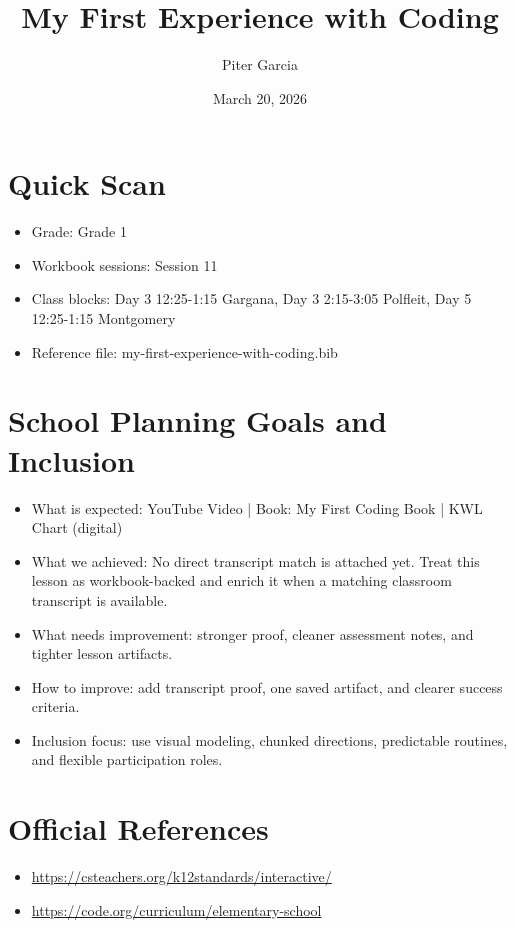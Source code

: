 \documentclass[11pt]{article}
\title{My First Experience with Coding}
\author{Piter Garcia}
\date{March 20, 2026}
\begin{document}
    \maketitle
    \section*{Quick Scan}
    \begin{itemize}[leftmargin=*]
    \item Grade: Grade 1
    \item Workbook sessions: Session 11
    \item Class blocks: Day 3 12:25-1:15 Gargana, Day 3 2:15-3:05 Polfleit, Day 5 12:25-1:15 Montgomery
    \item Reference file: my-first-experience-with-coding.bib
    \end{itemize}
    \section*{School Planning Goals and Inclusion}
    \begin{itemize}[leftmargin=*]
    \item What is expected: YouTube Video | Book: My First Coding Book | KWL Chart (digital)
    \item What we achieved: No direct transcript match is attached yet. Treat this lesson as workbook-backed and enrich it when a matching classroom transcript is available.
    \item What needs improvement: stronger proof, cleaner assessment notes, and tighter lesson artifacts.
    \item How to improve: add transcript proof, one saved artifact, and clearer success criteria.
    \item Inclusion focus: use visual modeling, chunked directions, predictable routines, and flexible participation roles.
    \end{itemize}
    \section*{Official References}
    \begin{itemize}[leftmargin=*]
    \item \url{https://csteachers.org/k12standards/interactive/}
\item \url{https://code.org/curriculum/elementary-school}

    \end{itemize}
    
\end{document}
